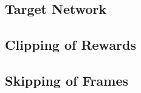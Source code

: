	\subsection{Target Network} %
		\label{sub:target_network}
	
	\subsection{Clipping of Rewards} %
		\label{sub:clipping_of_rewards}
	
	\subsection{Skipping of Frames} %
	\label{sub:skipping_of_frames}
	 
